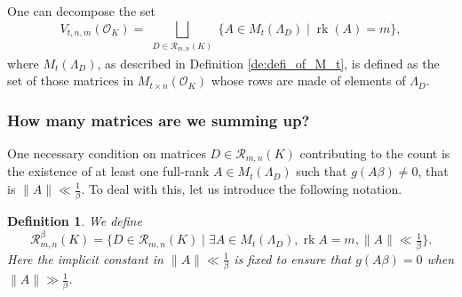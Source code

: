 \documentclass{amsart}
\newtheorem{definition}[theorem]{Definition}
\newcommand{\OK}{\mathcal{O}_K}
\DeclareMathOperator{\rank}{rk}
\begin{document}
One can decompose the set
\begin{equation}
	V_{t,n,m}(\mathcal{O}_K)  = \bigsqcup_{\substack{D \in \mathcal{R}_{m,n}(K)}} 
	\{A \in M_t(\Lambda_D) \mid \rank(A) = m \},
\end{equation}
where $M_t(\Lambda_D)$, as described in Definition \ref{de:defi_of_M_t}, is defined as the set of those matrices in $M_{t \times n}(\OK)$ whose rows are made of elements of $\Lambda_D$.

\subsubsection{How many matrices are we summing up?}

One necessary condition on matrices $D \in \mathcal{R}_{m,n}(K)$ contributing to the count is the existence of at least one full-rank $A \in M_{t}(\Lambda_D)$ such that $g(A \beta) \neq 0$, that is $\|A\|\ll \tfrac{1}{\beta}$. To deal with this, let us introduce the following notation.

\begin{definition}
\label{de:def_of_mathcalR_beta}
We  define 
\begin{equation}
  \mathcal{ R }^{\beta} _{m,n}(K) = \{ D \in \mathcal{R}_{m,n}(K) \mid   \exists A \in M_t(\Lambda_D), \rank A = m, \|A\| \ll \tfrac{1}{\beta}  \}.
\end{equation}
Here the implicit constant in $\|A\| \ll \tfrac{1}{\beta}$ 
is fixed to ensure that $g(A \beta) = 0$ when $\|A \|\gg \frac{1}{\beta}$.
\end{definition}
\end{document}
